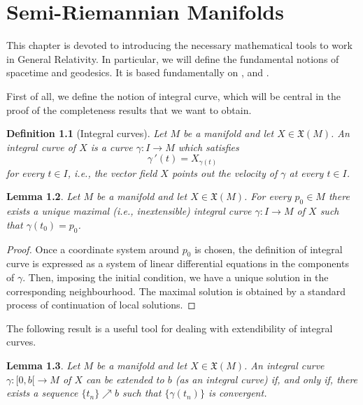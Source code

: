 \documentclass[11pt]{book}
\newtheorem{defi}{Definition}[chapter]
\newtheorem{lem}[defi]{Lemma}
\def\x{\mathfrak X}
\begin{document}
\pagestyle{fancy}
\fancyhead[RO,LE]{\leftmark}
\fancyhead[LO,RE]{\thepage}
\fancyfoot{}


\chapter{Semi-Riemannian Manifolds}\label{Chapter2}
This chapter is devoted to introducing the necessary mathematical tools to work in General Relativity. In particular, we will define the fundamental notions of spacetime and geodesics. It is based fundamentally on \cite{DM}, \cite{SRG} and \cite{SEC}. 

First of all, we define the notion of integral curve, which will be central in the proof of the completeness results that we want to obtain.
\begin{defi}[Integral curves]
	Let $M$ be a manifold and let $X\in \x(M)$. An integral curve of $X$ is a curve $\gamma:I\to M$ which satisfies
	\begin{equation}
		\gamma{\,'}(t)=X_{\gamma(t)}
	\end{equation}
	for every $t\in I$, i.e., the vector field $X$ points out the velocity of $\gamma$ at every $t\in I$.
\end{defi}

\begin{lem}
	Let $M$ be a manifold and let $X\in \x(M)$. 
	For every $p_0\in M$ there exists a unique maximal (i.e., inextensible) integral curve $\gamma:I\to M$ of $X$ such that $\gamma(t_0)=p_0$. 
\end{lem}
\begin{proof}
	Once a coordinate system around $p_0$ is chosen, the definition of integral curve is expressed as a system of linear differential equations in the components of $\gamma$. Then, imposing the initial condition, we have a unique solution in the corresponding neighbourhood. The maximal solution is obtained by a standard process of continuation of local solutions.
\end{proof}

The following result is a useful tool for dealing with extendibility of integral curves.
\begin{lem}\cite[Lemma 1.56]{SRG}\label{curv ext}
	Let $M$ be a manifold and let $X\in \x(M)$. An integral curve $\gamma:[0,b[ \to M$ of $X$ can be extended to $b$ (as an integral curve) if, and only if, there exists a sequence $\{t_n\}\nearrow b$ such that $\{\gamma(t_n)\}$ is convergent.
\end{lem}
\end{document}
